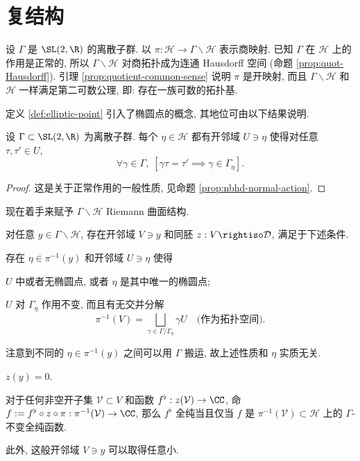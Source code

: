 \section{复结构}\label{sec:Y-charts}
设 $\Gamma$ 是 $\SL(2,\R)$ 的离散子群. 以 $\pi: \mathcal{H} \to \Gamma \backslash \mathcal{H}$ 表示商映射. 已知 $\Gamma$ 在 $\mathcal{H}$ 上的作用是正常的, 所以 $\Gamma \backslash \mathcal{H}$ 对商拓扑成为连通 Hausdorff 空间 (命题 \ref{prop:quot-Hausdorff}). 引理 \ref{prop:quotient-common-sense} 说明 $\pi$ 是开映射, 而且 $\Gamma\backslash\mathcal{H}$ 和 $\mathcal{H}$ 一样满足第二可数公理, 即: 存在一族可数的拓扑基.

定义 \ref{def:elliptic-point} 引入了椭圆点的概念, 其地位可由以下结果说明.

\begin{lemma}\label{prop:nbhd-elliptic}
	设 $\Gamma \subset \SL(2,\R)$ 为离散子群. 每个 $\eta \in \mathcal{H}$ 都有开邻域 $U \ni \eta$ 使得对任意 $\tau, \tau' \in U$,
	\[ \forall \gamma \in \Gamma, \; \left[ \gamma\tau=\tau' \implies \gamma \in \Gamma_\eta \right]. \]
\end{lemma}
\begin{proof}
	这是关于正常作用的一般性质, 见命题 \ref{prop:nbhd-normal-action}.
\end{proof}

现在着手来赋予 $\Gamma\backslash\mathcal{H}$ Riemann 曲面结构.
\begin{lemma}\label{prop:glueing-holomorphy}
	对任意 $y \in \Gamma \backslash \mathcal{H}$, 存在开邻域 $V \ni y$ 和同胚 $z: V \rightiso \mathcal{D}$, 满足于下述条件.
	\begin{compactitem}
		\item 存在 $\eta \in \pi^{-1}(y)$ 和开邻域 $U \ni \eta$ 使得
		\begin{compactitem}
			\item $U$ 中或者无椭圆点, 或者 $\eta$ 是其中唯一的椭圆点;
			\item $U$ 对 $\Gamma_\eta$ 作用不变, 而且有无交并分解
			\[ \pi^{-1}(V) = \bigsqcup_{\gamma \in  \Gamma/\Gamma_{\eta}} \gamma U \quad \text{(作为拓扑空间)}. \]
		\end{compactitem}
		注意到不同的 $\eta \in \pi^{-1}(y)$ 之间可以用 $\Gamma$ 搬运, 故上述性质和 $\eta$ 实质无关.
		\item $z(y) = 0$.
		\item 对于任何非空开子集 $\mathcal{V} \subset V$ 和函数 $f^\flat: z(\mathcal{V}) \to \CC$, 命 $f := f^\flat \circ z \circ \pi: \pi^{-1}(\mathcal{V}) \to \CC$, 那么 $f^\flat$ 全纯当且仅当 $f$ 是 $\pi^{-1}(\mathcal{V}) \subset \mathcal{H}$ 上的 $\Gamma$-不变全纯函数.
	\end{compactitem}
	此外, 这般开邻域 $V \ni y$ 可以取得任意小.
\end{lemma}


